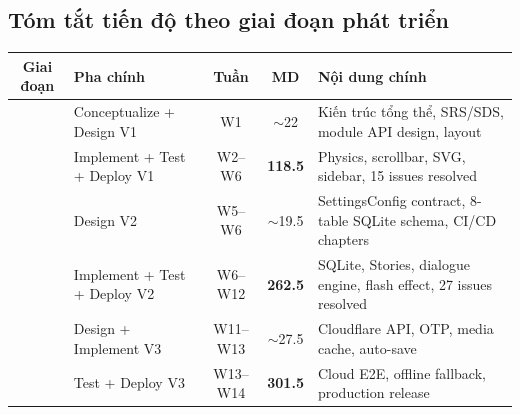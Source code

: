 \documentclass[12pt,a4paper]{article}
\begin{document}
\newpage %

\subsection{Tóm tắt tiến độ theo giai đoạn phát triển}

{\small
\begin{tabularx}{\linewidth}{|c|>{\raggedright\arraybackslash}p{4cm}|c|c|L|}
\hline
{}
\textbf{Giai đoạn} & \textbf{Pha chính} & \textbf{Tuần} & \textbf{MD} & \textbf{Nội dung chính} \\
\hline
{}
 &
Conceptualize + Design V1 & W1 & $\sim$22 & Kiến trúc tổng thể, SRS/SDS, module API design, layout \\
& Implement + Test + Deploy V1 & W2--W6 & \textbf{118.5} & Physics, scrollbar, SVG, sidebar, 15 issues resolved \\
\hline
{}
 &
Design V2 & W5--W6 & $\sim$19.5 & SettingsConfig contract, 8-table SQLite schema, CI/CD chapters \\
& Implement + Test + Deploy V2 & W6--W12 & \textbf{262.5} & SQLite, Stories, dialogue engine, flash effect, 27 issues resolved \\
\hline
{}
 &
Design + Implement V3 & W11--W13 & $\sim$27.5 & Cloudflare API, OTP, media cache, auto-save \\
& Test + Deploy V3 & W13--W14 & \textbf{301.5} & Cloud E2E, offline fallback, production release \\
\hline
\end{tabularx}
}

\label{LastPageProjectGanttChart}
\end{document}
